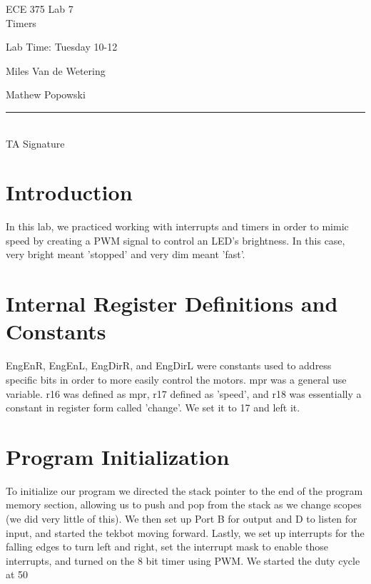 \documentclass[12pt,letterpaper]{article}
\begin{document}
\begin{titlepage}
    \vspace*{4cm}
    \begin{flushright}
    {\huge
        ECE 375 Lab 7\\[1cm]
    }
    {\large
        Timers
    }
    \end{flushright}
    \begin{flushleft}
    Lab Time: Tuesday 10-12
    \end{flushleft}
    \begin{flushright}
    Miles Van de Wetering

	Mathew Popowski
    \vfill
    \rule{5in}{.5mm}\\
    TA Signature
    \end{flushright}

\end{titlepage}

\section{Introduction}
In this lab, we practiced working with interrupts and timers in order to mimic speed by creating a PWM signal to control an LED's brightness. In this case, very bright meant 'stopped' and very dim meant 'fast'.

\section{Internal Register Definitions and Constants}
EngEnR, EngEnL, EngDirR, and EngDirL were constants used to address specific bits in order to more easily control the motors. mpr was a general use variable. r16 was defined as mpr, r17 defined as 'speed', and r18 was essentially a constant in register form called 'change'. We set it to 17 and left it.


\section{Program Initialization}
To initialize our program we directed the stack pointer to the end of the program memory section, allowing us to push and pop from the stack as we change scopes (we did very little of this). We then set up Port B for output and D to listen for input, and started the tekbot moving forward. Lastly, we set up interrupts for the falling edges to turn left and right, set the interrupt mask to enable those interrupts, and turned on the 8 bit timer using PWM. We started the duty cycle at 50%
\end{document}
